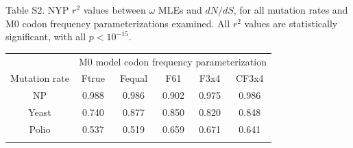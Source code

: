 \documentclass{pnastwo}
\begin{document}
\vspace{2cm}

\noindent Table S2. NYP $r^2$ values between $\omega$ MLEs and $dN/dS$, for all mutation rates and M0 codon frequency parameterizations examined. All $r^2$ values are statistically significant, with all $p < 10^{-15}$.
\begin{table}[htbp]
	\begin{tabular}{c c c c c c}
		\hline\noalign{\smallskip}
		& \multicolumn{5}{c}{M0 model codon frequency parameterization} \\
		\cline{2-6}\noalign{\medskip}
		Mutation rate & Ftrue & Fequal & F61 & F3x4 & CF3x4 \\
		\hline\noalign{\smallskip}
		NP & 0.988 & 0.986 & 0.902 & 0.975 & 0.986 \\
		Yeast & 0.740 & 0.877 & 0.850 & 0.820 & 0.848 \\
		Polio & 0.537 & 0.519 & 0.659 & 0.671 & 0.641 \\
		\noalign{\smallskip}\hline\noalign{\smallskip}
	\end{tabular}
\end{table}	
	
\end{document}
